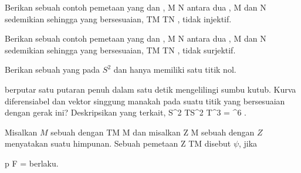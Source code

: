{}
{

Berikan sebuah contoh pemetaan yang
dan
,
\maabbdisp {\varphi} { M } { N
} {}
antara dua
,
\mathkor {} {M} {dan} {N} {}
sedemikian sehingga
yang bersesuaian,
 {TM} {TN
} {},
tidak injektif.

}
{} {}

{}
{

Berikan sebuah contoh pemetaan yang
dan
,
\maabbdisp {\varphi} { M } { N
} {}
antara dua
,
\mathkor {} {M} {dan} {N} {}
sedemikian sehingga
yang bersesuaian,
 {TM} {TN
} {},
tidak surjektif.

}
{} {}

{}
{

Berikan sebuah
yang
pada $S^2$ dan hanya memiliki satu titik nol.

}
{} {}

{}
{


 berputar satu putaran penuh dalam satu detik
 {} {}
mengelilingi sumbu kutub. Kurva diferensiabel dan vektor singgung manakah pada suatu titik
 yang bersesuaian dengan gerak ini? Deskripsikan
yang terkait,
\maabbdisp {} {S^2} {TS^2 \subseteq T\R^3 = \R^6
} {.}

}
{} {}

Misalkan $M$ sebuah
dengan
 {TM} {M
} {}
dan misalkan
\maabbdisp {\psi} { Z } { M
} {}
sebuah
dengan $Z$ menyatakan suatu himpunan. Sebuah pemetaan
 { Z } { TM
} {}
disebut
$\psi$, jika

\mavergleichskette
{\vergleichskette
{ p \circ F
}
{ = }{ \psi
}
{  }{
}
{    }{
}
{   }{
}
}
{}{}{}
berlaku.


